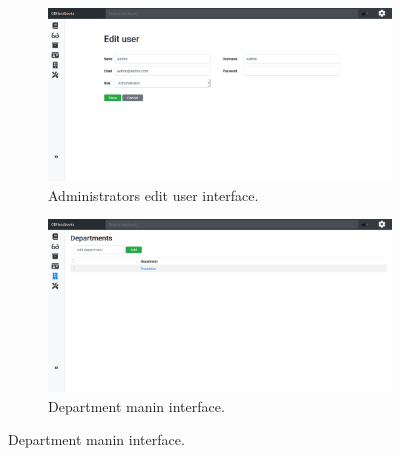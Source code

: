 \begin{figure}[H]\ContinuedFloat
	\centering
	\begin{subfigure}[b]{0.48\textwidth}
		\includegraphics[width=\textwidth]{billeder/iteration3Prototyper/EditUAdmin.png}
		\caption{Administrators edit user interface.}
		\label{fig:5-EditUAdmind}
	\end{subfigure}
	\quad
	\begin{subfigure}[b]{0.48\textwidth}
		\includegraphics[width=\textwidth]{billeder/iteration3Prototyper/Dep1.png}
		\caption{Department manin interface.}
		\label{fig:5-Dep1}
	\end{subfigure}
\end{figure}
